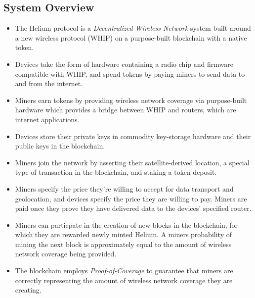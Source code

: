 \documentclass[letterpaper,11pt]{article}
\def\proofofcoverage/{\textit{Proof-of-Coverage}}
\begin{document}
\subsection{System Overview}

\begin{itemize}
	\item The Helium protocol is a \textit{Decentralized Wireless Network} system built around a new wireless protocol (WHIP) on a purpose-built blockchain with a native token.
	\item Devices take the form of hardware containing a radio chip and firmware compatible with WHIP, and spend tokens by paying miners to send data to and from the internet.
	\item Miners earn tokens by providing wireless network coverage via purpose-built hardware which provides a bridge between WHIP and routers, which are internet applications.
	\item Devices store their private keys in commodity key-storage hardware and their public keys in the blockchain.
	\item Miners join the network by asserting their satellite-derived location, a special type of transaction in the blockchain, and staking a token deposit.
	\item Miners specify the price they're willing to accept for data transport and geolocation, and devices specify the price they are willing to pay. Miners are paid once they prove they have delivered data to the devices' specified router.
	\item Miners can particpate in the creation of new blocks in the blockchain, for which they are rewarded newly minted Helium. A miners probability of mining the next block is approximately equal to the amount of wireless network coverage being provided.
	\item The blockchain employs \proofofcoverage/ to guarantee that miners are correctly representing the amount of wireless network coverage they are creating.
\end{itemize}
\end{document}

